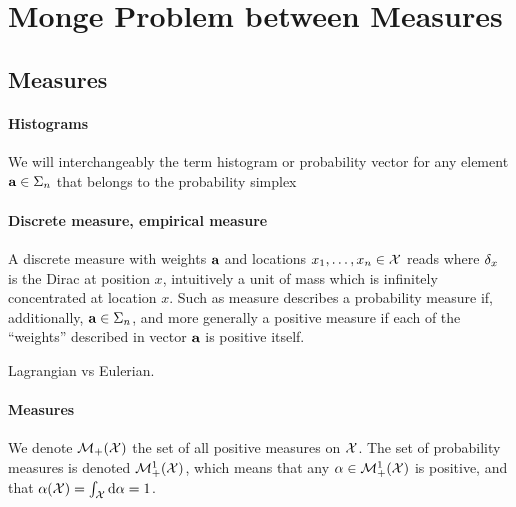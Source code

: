 
\section{Monge Problem between Measures}

\subsection{Measures}


\paragraph{Histograms}

We will interchangeably the term histogram or probability vector for any element $\mathrm{\textbf{\upshape a}} \in \Sigma_n$ that belongs to the probability simplex


\paragraph{Discrete measure, empirical measure}


A discrete measure with weights $\mathrm{\textbf{\upshape a}}$ and locations $x_1,\dots,x_n\in\mathcal{X}$ reads
where $\delta_x$ is the Dirac at position $x$, intuitively a unit of mass which is infinitely concentrated at location $x$. Such as measure describes a probability measure if, additionally, $\mathrm{\textbf{\upshape a}}\in\Sigma_n$, and more generally a positive measure if each of the ``weights'' described in vector $\mathrm{\textbf{\upshape a}}$ is positive itself. 

Lagrangian vs Eulerian. 


\paragraph{Measures}


We denote $\mathcal{M}_+(\mathcal{X})$ the set of all positive measures on $\mathcal{X}$. The set of probability measures is denoted $\mathcal{M}_+^1(\mathcal{X})$, which means that any $\alpha \in \mathcal{M}_+^1(\mathcal{X})$ is positive, and that $\alpha(\mathcal{X})=\int_{\mathcal{X}} \mathrm{d}\alpha = 1$. 



